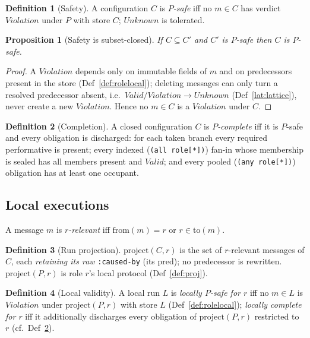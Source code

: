 \documentclass[11pt]{article}
\newcommand{\code}[1]{\texttt{#1}}
\newcommand{\caused}{\code{:caused-by}}
\theoremstyle{definition}
\newtheorem{definition}{Definition}
\theoremstyle{plain}
\newtheorem{proposition}{Proposition}
\begin{document}
\begin{definition}[Safety]
\label{def:psafe}
A configuration $C$ is \emph{$P$-safe} iff no $m\in C$ has verdict $\mathit{Violation}$
under $P$ with store $C$; $\mathit{Unknown}$ is tolerated.
\end{definition}

\begin{proposition}[Safety is subset-closed]
\label{prop:safe-mono}
If $C\subseteq C'$ and $C'$ is $P$-safe then $C$ is $P$-safe.
\end{proposition}
\begin{proof}
A $\mathit{Violation}$ depends only on immutable fields of $m$ and on predecessors
present in the store (Def~\ref{def:rolelocal}); deleting messages can only turn a
resolved predecessor absent, i.e.\ $\mathit{Valid}/\mathit{Violation}\to\mathit{Unknown}$
(Def~\ref{lat:lattice}), never create a new $\mathit{Violation}$.
Hence no $m\in C$ is a $\mathit{Violation}$ under $C$.
\end{proof}

\begin{definition}[Completion]
\label{def:pcomplete}
A closed configuration $C$ is \emph{$P$-complete} iff it is $P$-safe and every obligation
is discharged: for each taken branch every required performative is present; every indexed
(\code{(all role[*])}) fan-in whose membership is sealed has all members present and
$\mathit{Valid}$; and every pooled (\code{(any role[*])}) obligation has at least one
occupant.
\end{definition}

\subsection{Local executions}
A message $m$ is \emph{$r$-relevant} iff $\mathrm{from}(m)=r$ or $r\in\mathrm{to}(m)$.

\begin{definition}[Run projection]
\label{def:run-proj}
$\mathrm{project}(C,r)$ is the set of $r$-relevant messages of $C$, each \emph{retaining
its raw} \caused{} (its $\mathrm{pred}$); no predecessor is rewritten.
$\mathrm{project}(P,r)$ is role $r$'s local protocol (Def~\ref{def:proj}).
\end{definition}

\begin{definition}[Local validity]
\label{def:localvalid}
A local run $L$ is \emph{locally $P$-safe for $r$} iff no $m\in L$ is $\mathit{Violation}$
under $\mathrm{project}(P,r)$ with store $L$ (Def~\ref{def:rolelocal});
\emph{locally complete for $r$} iff it additionally discharges every obligation of
$\mathrm{project}(P,r)$ restricted to $r$ (cf.\ Def~\ref{def:pcomplete}).
\end{definition}
\end{document}
